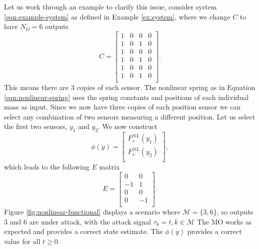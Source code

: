 \begin{example}\label{ex:nonlinear-issue}
    Let us work through an example to clarify this issue, consider system \eqref{eqn:example-system} as defined in Example \ref{ex:system}, where we change $C$ to have $N_O=6$ outputs
    \begin{equation}\label{eqn:NL-ex-C-6out}
        C = 
        \begin{bmatrix}
            1 & 0 & 0 & 0 \\
            1 & 0 & 1 & 0 \\
            1 & 0 & 0 & 0 \\
            1 & 0 & 1 & 0 \\
            1 & 0 & 0 & 0 \\
            1 & 0 & 1 & 0 \\
        \end{bmatrix}.
    \end{equation}
    This means there are 3 copies of each sensor. The nonlinear spring as in Equation \eqref{eqn:nonlinear-spring} uses the spring constants and positions of each individual mass as input. Since we now have three copies of each position sensor we can select any combination of two sensors measuring a different position. Let us select the first two sensors, $y_1$ and $y_2$. We now construct
    \begin{equation}\label{eqn:NL-ex-phi-6out}
        \phi(y) = 
        \begin{bmatrix}
            F^{NL}_s(y_1) \\ F^{NL}_s(y_2) \\
        \end{bmatrix},
    \end{equation}
    which leads to the following $E$ matrix
    \begin{equation}\label{eqn:NL-ex-E-6out}
        E =
        \begin{bmatrix}
            0 & 0 \\
            -1 & 1 \\
            0 & 0 \\
            0 & -1 \\
        \end{bmatrix}.
    \end{equation}
    Figure \ref{fig:nonlinear-functional} displays a scenario where $\mathcal{M}=\{3,6\}$, so outputs $3$ and $6$ are under attack, with the attack signal $\tau_k=t,k \in \mathcal{M}$ The MO works as expected and provides a correct state estimate. The $\phi(y)$ provides a correct value for all $t \geq 0$.

\end{example}
